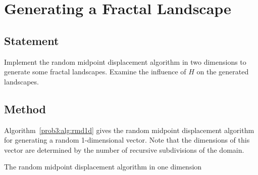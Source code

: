 \section{Generating a Fractal Landscape}

\subsection{Statement}
Implement the random midpoint displacement algorithm in two dimensions to generate some fractal landscapes.
Examine the influence of $H$ on the generated landscapes.

\subsection{Method}
Algorithm~\ref{prob3:alg:rmd1d} gives the random midpoint displacement algorithm for generating a random 1-dimensional vector.
Note that the dimensions of this vector are determined by the number of recursive subdivisions of the domain.

\begin{algorithm}
    \begin{algorithmic}
            \EndFor{}
            \State{}
            \State{}
        \EndFunction{}
                \State{}
                \State{}
            \EndIf{}
        \EndFunction{}
    \end{algorithmic}
    \caption{The random midpoint displacement algorithm in one dimension}\label{prob3:alg:rmd1d}
\end{algorithm}

